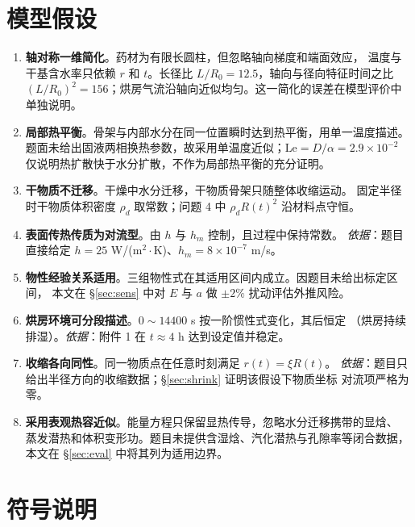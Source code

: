\documentclass[withoutpreface,bwprint]{cumcmthesis}
\begin{document}
\section{模型假设}

\begin{enumerate}[leftmargin=1.9em,itemsep=2pt]
\item \textbf{轴对称一维简化}。药材为有限长圆柱，但忽略轴向梯度和端面效应，
温度与干基含水率只依赖 $r$ 和 $t$。长径比 $L/R_0=12.5$，轴向与径向特征时间之比
$(L/R_0)^2=156$；烘房气流沿轴向近似均匀。这一简化的误差在模型评价中单独说明。
\item \textbf{局部热平衡}。骨架与内部水分在同一位置瞬时达到热平衡，用单一温度描述。
题面未给出固液两相换热参数，故采用单温度近似；$\mathrm{Le}=D/\alpha=2.9\times10^{-2}$
仅说明热扩散快于水分扩散，不作为局部热平衡的充分证明。
\item \textbf{干物质不迁移}。干燥中水分迁移，干物质骨架只随整体收缩运动。
固定半径时干物质体积密度 $\rho_d$ 取常数；问题 4 中 $\rho_dR(t)^2$ 沿材料点守恒。
\item \textbf{表面传热传质为对流型}。由 $h$ 与 $h_m$ 控制，且过程中保持常数。
\emph{依据}：题目直接给定 $h=25$ W/(m$^2\cdot$K)、$h_m=8\times10^{-7}$ m/s。
\item \textbf{物性经验关系适用}。三组物性式在其适用区间内成立。因题目未给出标定区间，
本文在 \S\ref{sec:sens} 中对 $E$ 与 $a$ 做 $\pm2\%$ 扰动评估外推风险。
\item \textbf{烘房环境可分段描述}。$0\sim14400$ s 按一阶惯性式变化，其后恒定
（烘房持续排湿）。\emph{依据}：附件 1 在 $t\approx4$ h 达到设定值并稳定。
\item \textbf{收缩各向同性}。同一物质点在任意时刻满足 $r(t)=\xi R(t)$。
\emph{依据}：题目只给出半径方向的收缩数据；\S\ref{sec:shrink} 证明该假设下物质坐标
对流项严格为零。
\item \textbf{采用表观热容近似}。能量方程只保留显热传导，忽略水分迁移携带的显焓、
蒸发潜热和体积变形功。题目未提供含湿焓、汽化潜热与孔隙率等闭合数据，
本文在 \S\ref{sec:eval} 中将其列为适用边界。
\end{enumerate}

\section{符号说明}
\end{document}
